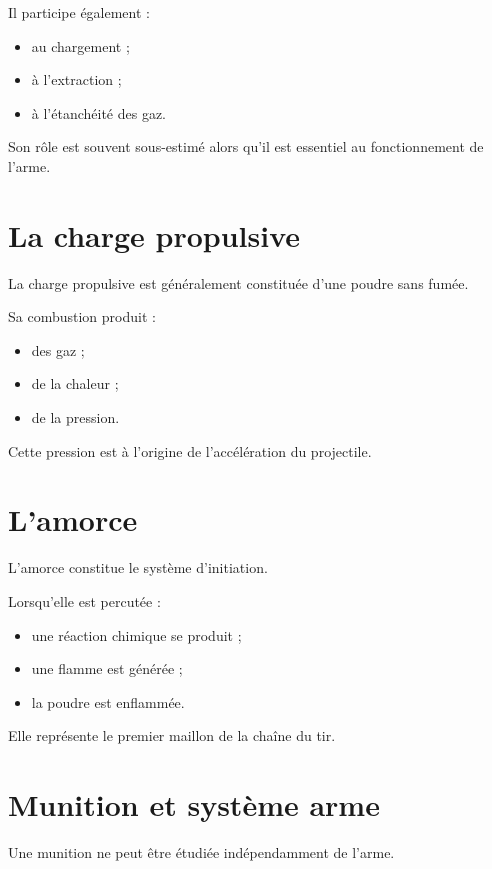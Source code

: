 Il participe également :

\begin{itemize}
    \item au chargement ;
    \item à l'extraction ;
    \item à l'étanchéité des gaz.
\end{itemize}

Son rôle est souvent sous-estimé alors qu'il est essentiel au
fonctionnement de l'arme.

\section{La charge propulsive}

La charge propulsive est généralement constituée d'une poudre sans fumée.

Sa combustion produit :

\begin{itemize}
    \item des gaz ;
    \item de la chaleur ;
    \item de la pression.
\end{itemize}

Cette pression est à l'origine de l'accélération du projectile.

\section{L'amorce}

L'amorce constitue le système d'initiation.

Lorsqu'elle est percutée :

\begin{itemize}
    \item une réaction chimique se produit ;
    \item une flamme est générée ;
    \item la poudre est enflammée.
\end{itemize}

Elle représente le premier maillon de la chaîne du tir.

\section{Munition et système arme}

Une munition ne peut être étudiée indépendamment de l'arme.

